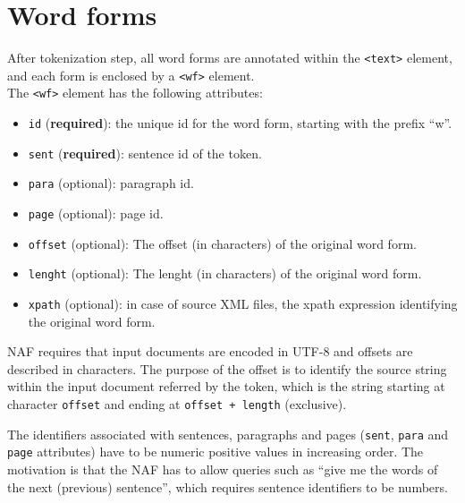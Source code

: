 
\section{Word forms}
\label{sec:word-forms}

After tokenization step, all word forms are annotated within the
\texttt{<text>} element, and each form is enclosed by a \texttt{<wf>}
element.\\

The \texttt{<wf>} element has the following attributes:
\begin{itemize}
\item \texttt{id} (\textbf{required}): the unique id for the word form,
  starting with the prefix ``w''.
\item \texttt{sent} (\textbf{required}): sentence id of the token.
\item \texttt{para} (optional): paragraph id.
\item \texttt{page} (optional): page id.
\item \texttt{offset} (optional): The offset (in characters) of the original
  word form.
\item \texttt{lenght} (optional): The lenght (in characters) of the original
  word form.
\item \texttt{xpath} (optional): in case of source XML files, the xpath
  expression identifying the original word form.
\end{itemize}

NAF requires that input documents are encoded in UTF-8 and offsets are
described in characters. The purpose of the offset is to identify the source
string within the input document referred by the token, which is the string
starting at character \texttt{offset} and ending at \texttt{offset + length}
(exclusive).

The identifiers associated with sentences, paragraphs and pages
(\texttt{sent}, \texttt{para} and \texttt{page} attributes) have to be
numeric positive values in increasing order. The motivation is that the NAF
has to allow queries such as ``give me the words of the next (previous)
sentence'', which requires sentence identifiers to be numbers.


